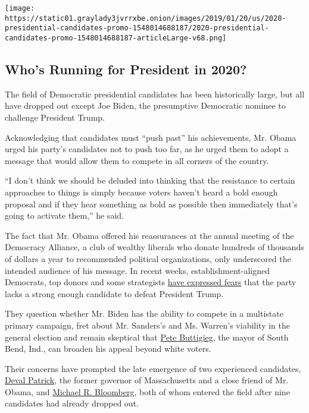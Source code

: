\href{https://www.nytimes3xbfgragh.onion/interactive/2019/us/politics/2020-presidential-candidates.html}{}

\texttt{[image: https://static01.graylady3jvrrxbe.onion/images/2019/01/20/us/2020-presidential-candidates-promo-1548014688187/2020-presidential-candidates-promo-1548014688187-articleLarge-v68.png]}

\hypertarget{whos-running-for-president-in-2020}{%
\subsection{Who's Running for President in
2020?}\label{whos-running-for-president-in-2020}}

The field of Democratic presidential candidates has been historically
large, but all have dropped out except Joe Biden, the presumptive
Democratic nominee to challenge President Trump.

Acknowledging that candidates must ``push past'' his achievements, Mr.
Obama urged his party's candidates not to push too far, as he urged them
to adopt a message that would allow them to compete in all corners of
the country.

``I don't think we should be deluded into thinking that the resistance
to certain approaches to things is simply because voters haven't heard a
bold enough proposal and if they hear something as bold as possible then
immediately that's going to activate them,'' he said.

The fact that Mr. Obama offered his reassurances at the annual meeting
of the Democracy Alliance, a club of wealthy liberals who donate
hundreds of thousands of dollars a year to recommended political
organizations, only underscored the intended audience of his message. In
recent weeks, establishment-aligned Democrats, top donors and some
strategists
\href{https://www.nytimes3xbfgragh.onion/2019/11/12/us/politics/bloomberg-deval-patrick-2020.html}{have
expressed fears} that the party lacks a strong enough candidate to
defeat President Trump.

They question whether Mr. Biden has the ability to compete in a
multistate primary campaign, fret about Mr. Sanders's and Ms. Warren's
viability in the general election and remain skeptical that
\href{https://www.nytimes3xbfgragh.onion/interactive/2020/us/elections/pete-buttigieg.html?module=inline}{Pete
Buttigieg}, the mayor of South Bend, Ind., can broaden his appeal beyond
white voters.

Their concerns have prompted the late emergence of two experienced
candidates,
\href{https://www.nytimes3xbfgragh.onion/2019/11/14/us/politics/deval-patrick-2020-president.html?module=inline}{Deval
Patrick}, the former governor of Massachusetts and a close friend of Mr.
Obama, and
\href{https://www.nytimes3xbfgragh.onion/2019/11/12/us/politics/bloomberg-deval-patrick-2020.html?module=inline}{Michael
R. Bloomberg}, both of whom entered the field after nine candidates had
already dropped out.

